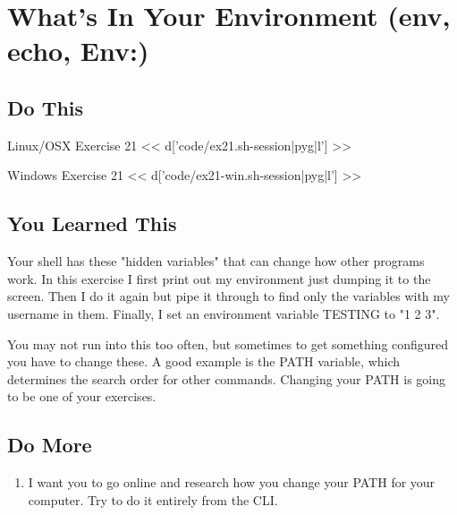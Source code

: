 \chapter{What's In Your Environment (env, echo, Env:)}

\section{Do This}

\begin{code}{Linux/OSX Exercise 21}
<< d['code/ex21.sh-session|pyg|l'] >>
\end{code}

\begin{code}{Windows Exercise 21}
<< d['code/ex21-win.sh-session|pyg|l'] >>
\end{code}

\section{You Learned This}

Your shell has these "hidden variables" that can change how other programs work.
In this exercise I first print out my environment just dumping it to the screen.
Then I do it again but pipe it through  to find only the variables
with my username in them.  Finally, I set an environment variable TESTING to "1 2 3".

You may not run into this too often, but sometimes to get something configured
you have to change these.  A good example is the PATH variable, which determines
the search order for other commands.  Changing your PATH is going to be one
of your exercises.


\section{Do More}

\begin{enumerate}
\item I want you to go online and research how you change your PATH for your computer.  Try to do it entirely from the CLI.
\end{enumerate}

